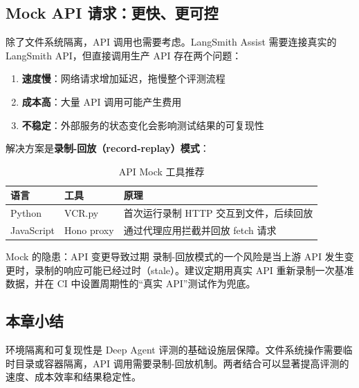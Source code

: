 \subsection{Mock API 请求：更快、更可控}

除了文件系统隔离，API 调用也需要考虑。LangSmith Assist 需要连接真实的 LangSmith API，但直接调用生产 API 存在两个问题：

\begin{enumerate}
  \item \textbf{速度慢}：网络请求增加延迟，拖慢整个评测流程
  \item \textbf{成本高}：大量 API 调用可能产生费用
  \item \textbf{不稳定}：外部服务的状态变化会影响测试结果的可复现性
\end{enumerate}

解决方案是\textbf{录制-回放（record-replay）模式}：

\begin{table}[H]
\centering
\caption{API Mock 工具推荐}
\begin{tabular}{llp{7cm}}
\toprule
\textbf{语言} & \textbf{工具} & \textbf{原理} \\
\midrule
Python & VCR.py & 首次运行录制 HTTP 交互到文件，后续回放 \\
JavaScript & Hono proxy & 通过代理应用拦截并回放 fetch 请求 \\
\bottomrule
\end{tabular}
\end{table}

\begin{warningbox}{Mock 的隐患：API 变更导致过期}
录制-回放模式的一个风险是当上游 API 发生变更时，录制的响应可能已经过时（stale）。建议定期用真实 API 重新录制一次基准数据，并在 CI 中设置周期性的``真实 API''测试作为兜底。
\end{warningbox}

\subsection{本章小结}

环境隔离和可复现性是 Deep Agent 评测的基础设施层保障。文件系统操作需要临时目录或容器隔离，API 调用需要录制-回放机制。两者结合可以显著提高评测的速度、成本效率和结果稳定性。


